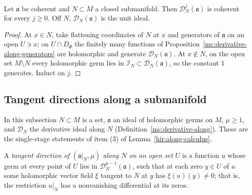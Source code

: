 \begin{corollary}
\label{mc:derivative-along-coherent}
\leanok
Let \(\mathfrak a\) be coherent and \(N\subset M\) a closed submanifold. Then \(\mathcal D_N^j(\mathfrak a)\) is coherent for every \(j\ge0\). Off \(N\),
\(\mathcal D_N(\mathfrak a)\) is the unit ideal.
\end{corollary}
\begin{proof}
\leanok
At \(x\in N\), take flattening coordinates of \(N\) at \(x\) and generators of \(\mathfrak a\) on an open \(U\ni x\); on \(U\cap D_\Phi\) the finitely many functions of
Proposition~\ref{mc:derivative-along-generators} are holomorphic and generate \(\mathcal D_N(\mathfrak a)\). At \(x\notin N\), on the open set \(M\setminus N\) every
holomorphic germ lies in \(\mathcal I_N\subset\mathcal D_N(\mathfrak a)\), so the constant \(1\) generates. Induct on \(j\).
\end{proof}

\subsection{Tangent directions along a submanifold}

In this subsection \(N\subset M\) is a set, \(\mathfrak a\) an ideal of holomorphic germs on \(M\), \(\mu\ge1\), and \(\mathcal D_N\) the derivative ideal along \(N\)
(Definition~\ref{mc:derivative-along}). These are the single-stage statements of item (3) of Lemma~\ref{hir:along-calculus}.

\begin{definition}
\label{mc:tangent-direction-along}
\leanok
A \emph{tangent direction of \((\mathfrak a|_N,\mu)\) along \(N\) on an open set \(U\)} is a function \(u\) whose germ at every point of \(U\) lies in
\(\mathcal D_N^{\mu-1}(\mathfrak a)\), such that at each zero \(y\in U\) of \(u\) some holomorphic vector field \(\xi\) tangent to \(N\) at \(y\) has
\(\xi(u)(y)\ne0\); that is, the restriction \(u|_N\) has a nonvanishing differential at its zeros.
\end{definition}

